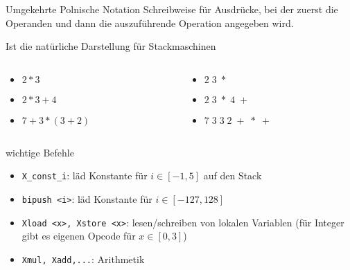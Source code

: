 \documentclass{beamer}
\begin{document}
\begin{frame}{Umgekehrte Polnische Notation}
    Schreibweise für Ausdrücke, bei der zuerst die Operanden und dann die auszuführende Operation angegeben wird. 

    Ist die natürliche Darstellung für Stackmaschinen
    \hspace{1cm}
    \begin{columns}
        \begin{column}{0.3 \textwidth}
            \begin{itemize}
                \item $2 * 3$
                \item $2 * 3 + 4$
                \item $7 + 3 * (3+2)$
            \end{itemize}
        \end{column}
        \begin{column}{0.3 \textwidth}
            \begin{itemize}
                \pause
                \item $2 \; 3 \; *$
                \pause
                \item $2 \; 3 \; * \; 4 \;+$
                \pause
                \item $7 \; 3 \; 3 \; 2 \; + \; * \; +$
            \end{itemize}
        \end{column}
    \end{columns}
\end{frame}


\begin{frame}{wichtige Befehle}
    \begin{itemize}
        \item \texttt{X\_const\_i}: läd Konstante für $i \in [-1,5]$ auf den Stack
        \item \texttt{bipush <i>}: läd Konstante für $i \in [-127,128]$
        \item \texttt{Xload <x>, Xstore <x>}: lesen/schreiben von lokalen Variablen (für Integer gibt es eigenen Opcode für $x \in [0,3]$)
        \item \texttt{Xmul, Xadd,...}: Arithmetik
    \end{itemize}
\end{frame}
\end{document}
